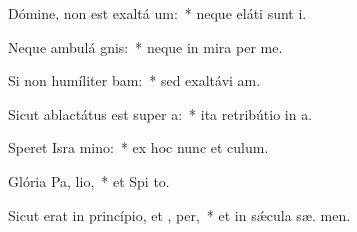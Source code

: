 \item Dómine, non est exaltá  um:~* neque eláti sunt  i.
\item Neque ambulá  gnis:~* neque in mira per me.
\item Si non humíliter bam:~* sed exaltávi  am.
\item Sicut ablactátus est super  a:~* ita retribútio in  a.
\item Speret Isra  mino:~* ex hoc nunc et   culum.
\item Glória Pa,  lio,~* et Spi to.
\item Sicut erat in princípio, et ,  per,~* et in sǽcula sæ. men.
